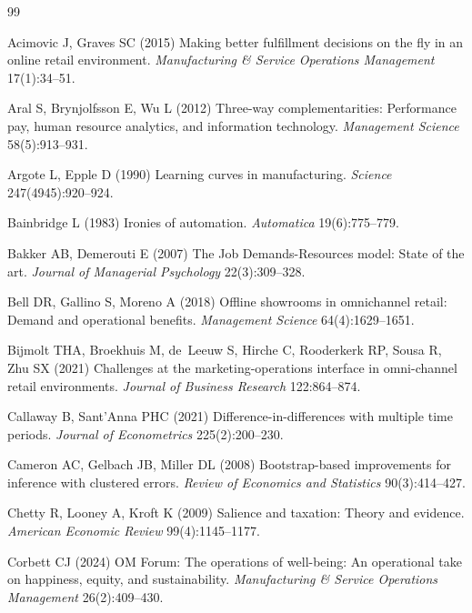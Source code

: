 \documentclass[msom,dblanonrev]{informs4}
\begin{document}
\SingleSpacedXI
\begin{thebibliography}{99}

Acimovic J, Graves SC (2015) Making better fulfillment decisions on the fly in an online retail environment.
\textit{Manufacturing \& Service Operations Management} 17(1):34--51.

Aral S, Brynjolfsson E, Wu L (2012) Three-way complementarities: Performance pay, human resource analytics, and information technology.
\textit{Management Science} 58(5):913--931.

Argote L, Epple D (1990) Learning curves in manufacturing.
\textit{Science} 247(4945):920--924.

Bainbridge L (1983) Ironies of automation.
\textit{Automatica} 19(6):775--779.

Bakker AB, Demerouti E (2007) The Job Demands-Resources model: State of the art.
\textit{Journal of Managerial Psychology} 22(3):309--328.

Bell DR, Gallino S, Moreno A (2018) Offline showrooms in omnichannel retail: Demand and operational benefits.
\textit{Management Science} 64(4):1629--1651.

Bijmolt THA, Broekhuis M, de~Leeuw S, Hirche C, Rooderkerk RP, Sousa R, Zhu SX (2021) Challenges at the marketing-operations interface in omni-channel retail environments.
\textit{Journal of Business Research} 122:864--874.

Callaway B, Sant'Anna PHC (2021) Difference-in-differences with multiple time periods.
\textit{Journal of Econometrics} 225(2):200--230.

Cameron AC, Gelbach JB, Miller DL (2008) Bootstrap-based improvements for inference with clustered errors.
\textit{Review of Economics and Statistics} 90(3):414--427.

Chetty R, Looney A, Kroft K (2009) Salience and taxation: Theory and evidence.
\textit{American Economic Review} 99(4):1145--1177.

Corbett CJ (2024) OM Forum: The operations of well-being: An operational take on happiness, equity, and sustainability.
\textit{Manufacturing \& Service Operations Management} 26(2):409--430.


\end{thebibliography}
\end{document}
